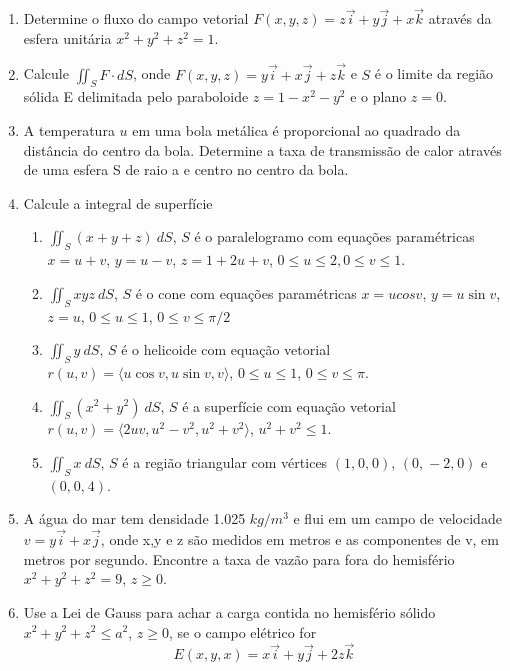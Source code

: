 \documentclass[11pt,a4paper]{article}
\begin{document}
\begin{enumerate}
     \item Determine o fluxo do campo vetorial $F(x,y,z) = z \vec{i} + y \vec{j} + x \vec{k}$ através da esfera unitária $x^2 + y^2 + z^2 = 1$.
     
     \item Calcule $\displaystyle\iint_S F \cdot dS$, onde $F(x,y,z) = y\vec{i} + x\vec{j} + z\vec{k}$ e $S$ é o limite da região sólida E delimitada pelo paraboloide $z = 1 - x^2 - y^2$ e o plano $z = 0$.
     
     \item A temperatura $u$ em uma bola metálica é proporcional ao quadrado da distância do centro da bola. Determine a taxa de transmissão de calor através de uma esfera S de raio a e centro no centro da bola.
     
     \item Calcule a integral de superfície
     \begin{enumerate}
     \item $\displaystyle\iint_S (x + y + z) \ dS$, $S$ é o paralelogramo com equações paramétricas $x = u + v$, $y = u - v$, $z = 1 + 2u + v$, $0 \leq u \leq 2, 0 \leq v \leq 1$.
     \item $\displaystyle\iint_S xyz \ dS$, $S$ é o cone com equações paramétricas $x = ucos v$, $y = u\sin v$, $z = u$, $0 \leq u \leq 1$, $0 \leq v \leq \pi/2$
     \item $\displaystyle\iint_S y \ dS$, $S$ é o helicoide com equação vetorial $r(u,v) = \langle u \cos v, u \sin v, v \rangle$, $0 \leq u \leq 1$, $0 \leq v \leq \pi$.
     \item $\displaystyle\iint_S (x^2 + y^2) \ dS$, $S$ é a superfície com equação vetorial $r(u,v) = \langle 2uv, u^2 - v^2, u^2 + v^2 \rangle$, $u^2 + v^2 \leq 1$.
     \item $\displaystyle\iint_S x \ dS$, $S$ é a região triangular com vértices $(1 \textrm{,}\ 0 \textrm{,}\ 0)$, $(0 \textrm{,}\ -2 \textrm{,}\ 0)$ e $(0 \textrm{,}\ 0 \textrm{,}\ 4)$.
     \end{enumerate}
     
     \item A água do mar tem densidade 1.025 $kg/m^3$ e flui em um campo de velocidade $v = y\vec{i} + x\vec{j}$, onde x,y e z são medidos em metros e as componentes de v, em metros por segundo. Encontre a taxa de vazão para fora do hemisfério $x^2 + y^2 + z^2 = 9$, $z \geq 0$.
     
     \item Use a Lei de Gauss para achar a carga contida no hemisfério sólido $x^2 + y^2 + z^2 \leq a^2$, $z \geq 0$, se o campo elétrico for 
     $$E(x,y,x) = x\vec{i} + y\vec{j} + 2z\vec{k}$$ 
     

\end{enumerate}
\end{document}

